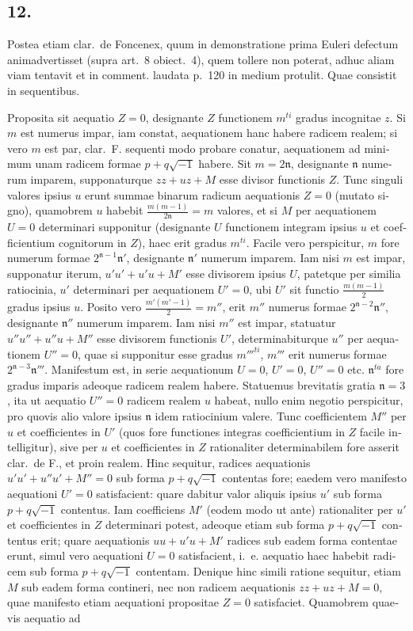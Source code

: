 \documentclass[12pt,a4paper]{article}
\begin{document}
\begin{otherlanguage}{latin}
\subsection*{12.}
Postea etiam clar.~de Foncenex, quum in demonstratione prima Euleri defectum animadvertisset (supra art.~8 obiect.~4), quem tollere non poterat, adhuc aliam viam tentavit et in comment. laudata p.~120 in medium protulit. Quae consistit in sequentibus.

Proposita sit aequatio $Z=0$, designante $Z$ functionem $m^{ti}$ gradus incognitae $z$. Si $m$ est numerus impar, iam constat, aequationem hanc habere radicem realem; si vero $m$ est par, clar.~F. sequenti modo probare conatur, aequationem ad minimum unam radicem formae $p+q\sqrt{-1}$ habere. Sit $m=2\mathfrak{n}$, designante $\mathfrak{n}$ numerum imparem, supponaturque $zz+uz+M$ esse divisor functionis $Z$. Tunc singuli valores ipsius $u$ erunt summae binarum radicum aequationis $Z=0$ (mutato signo), quamobrem $u$ habebit $\frac{m(m-1)}{2\mathfrak{n}}=m$ valores, et si $M$ per aequationem $U=0$ determinari supponitur (designante $U$ functionem integram ipsius $u$ et coefficientium cognitorum in $Z$), haec erit gradus $m^{ti}$. Facile vero perspicitur, $m$ fore numerum formae $2^{\mathfrak{n}-1}\mathfrak{n}'$, designante $\mathfrak{n}'$ numerum imparem. Iam nisi $m$ est impar, supponatur iterum, $u'u'+u'u+M'$ esse divisorem ipsius $U$, patetque per similia ratiocinia, $u'$ determinari per aequationem $U'=0$, ubi $U'$ sit functio $\frac{m(m-1)}{2}$ gradus ipsius $u$. Posito vero $\frac{m'(m'-1)}{2}=m''$, erit $m''$ numerus formae $2^{\mathfrak{n}-2}\mathfrak{n}''$, designante $\mathfrak{n}''$ numerum imparem. Iam nisi $m''$ est impar, statuatur $u''u''+u''u+M''$ esse divisorem functionis $U'$, determinabiturque $u''$ per aequationem $U''=0$, quae si supponitur esse gradus $m'''^{ti}$, $m'''$ erit numerus formae $2^{\mathfrak{n}-3}\mathfrak{n}'''$. Manifestum est, in serie aequationum $U=0$, $U'=0$, $U''=0$ etc. $\mathfrak{n}^{ta}$ fore gradus imparis adeoque radicem realem habere. Statuemus brevitatis gratia $\mathfrak{n}=3$, ita ut aequatio $U''=0$ radicem realem $u$ habeat, nullo enim negotio perspicitur, pro quovis alio valore ipsius $\mathfrak{n}$ idem ratiocinium valere. Tunc coefficientem $M''$ per $u$ et coefficientes in $U'$ (quos fore functiones integras coefficientium in $Z$ facile intelligitur), sive per $u$ et coefficientes in $Z$ rationaliter determinabilem fore asserit clar.~de F., et proin realem. Hinc sequitur, radices aequationis $u'u'+u''u'+M''=0$ sub forma $p+q\sqrt{-1}$ contentas fore; eaedem vero manifesto aequationi $U'=0$ satisfacient: quare dabitur valor aliquis ipsius $u'$ sub forma $p+q\sqrt{-1}$ contentus. Iam coefficiens $M'$ (eodem modo ut ante) rationaliter per $u'$ et coefficientes in $Z$ determinari potest, adeoque etiam sub forma $p+q\sqrt{-1}$ contentus erit; quare aequationis $uu+u'u+M'$ radices sub eadem forma contentae erunt, simul vero aequationi $U=0$ satisfacient, i.~e. aequatio haec habebit radicem sub forma $p+q\sqrt{-1}$ contentam. Denique hinc simili ratione sequitur, etiam $M$ sub eadem forma contineri, nec non radicem aequationis $zz+uz+M=0$, quae manifesto etiam aequationi propositae $Z=0$ satisfaciet. Quamobrem quaevis aequatio ad 
\end{otherlanguage}
\end{document}
